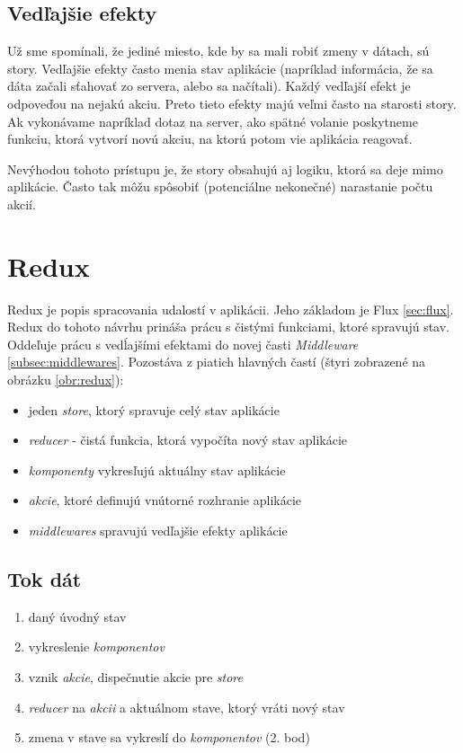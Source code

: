 \subsection{Vedľajšie efekty} 
Už sme spomínali, že jediné miesto, kde by sa mali robiť zmeny v dátach, sú story. Vedľajšie efekty často menia stav aplikácie (napríklad informácia, že sa dáta začali sťahovať zo servera, alebo sa načítali). Každý vedľajší efekt je odpoveďou na nejakú akciu. Preto tieto efekty majú veľmi často na starosti story. Ak vykonávame napríklad dotaz na server, ako spätné volanie poskytneme funkciu, ktorá vytvorí novú akciu, na ktorú potom vie aplikácia reagovať.

Nevýhodou tohoto prístupu je, že story obsahujú aj logiku, ktorá sa deje mimo aplikácie. Často tak môžu spôsobiť (potenciálne nekonečné) narastanie počtu akcií.










\section{Redux}
Redux \cite{Redux} je popis spracovania udalostí v aplikácii. Jeho základom je Flux \ref{sec:flux}. Redux do tohoto návrhu prináša prácu s čistými funkciami, ktoré spravujú stav. Oddeľuje prácu s vedĺajšími efektami do novej časti \emph{Middleware} \ref{subsec:middlewares}. Pozostáva z piatich hlavných častí (štyri zobrazené na obrázku \ref{obr:redux}):
\begin{itemize}
\item jeden \emph{store}, ktorý spravuje celý stav aplikácie
\item \emph{reducer} - čistá funkcia, ktorá vypočíta nový stav aplikácie
\item \emph{komponenty} vykresľujú aktuálny stav aplikácie
\item \emph{akcie}, ktoré definujú vnútorné rozhranie aplikácie
\item \emph{middlewares} spravujú vedľajšie efekty aplikácie
\end{itemize}

\subsection{Tok dát}
\begin{enumerate}
\item daný úvodný stav
\item vykreslenie \emph{komponentov}
\item vznik \emph{akcie}, dispečnutie akcie pre \emph{store}
\item \emph{reducer} na \emph{akcii} a aktuálnom stave, ktorý vráti nový stav
\item zmena v stave sa vykreslí do \emph{komponentov} (2. bod)
\end{enumerate}

